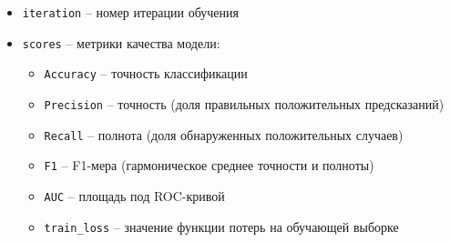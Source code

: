 \documentclass[a4paper,12pt]{article}
\begin{document}
\begin{itemize}
  \item \texttt{iteration} -- номер итерации обучения

  \item \texttt{scores} -- метрики качества модели:
    \begin{itemize}
      \item \texttt{Accuracy} -- точность классификации
      \item \texttt{Precision} -- точность (доля правильных положительных предсказаний)
      \item \texttt{Recall} -- полнота (доля обнаруженных положительных случаев)
      \item \texttt{F1} -- F1-мера (гармоническое среднее точности и полноты)
      \item \texttt{AUC} -- площадь под ROC-кривой
      \item \texttt{train\_loss} -- значение функции потерь на обучающей выборке
    \end{itemize}
\end{itemize}
\end{document}
